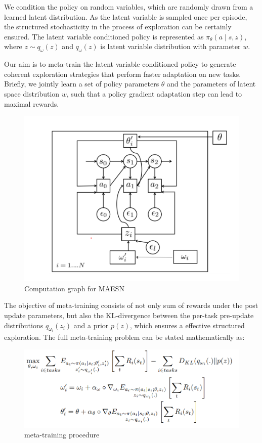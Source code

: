  We condition the policy on random variables, which are randomly drawn from a learned latent distribution. As the latent variable is sampled once per episode, the structured stochasticity in the process of exploration can be certainly ensured. The latent variable conditioned policy is represented as $\pi_{\theta}(a \mid s, z)$, where $z \sim q_{\omega}(z)$ and $q_{\omega}(z)$ is latent variable distribution with parameter $w$. 

Our aim is to meta-train the latent variable conditioned policy to generate coherent exploration strategies that perform faster adaptation on new tasks. Briefly, we jointly learn a set of policy parameters $\theta$ and the parameters of latent space distribution $w$, such that a policy gradient adaptation step can lead to maximal rewards.

\begin{figure}[H]
	\includegraphics[scale=0.6]{MAESN_02.PNG}
	\centering
	\caption{Computation graph for MAESN}
	\label{MAESN}
\end{figure}

The objective of meta-training consists of not only sum of rewards under the post update parameters, but also the KL-divergence between the per-task pre-update distributions $q_{\omega_{i}}\left(z_{i}\right)$ and a prior $p(z)$, which ensures a effective structured exploration.
The full meta-training problem can be stated mathematically as:

\begin{figure}[H]
	\includegraphics[scale=0.48]{MAESN_03.PNG}
	\centering
	\caption{meta-training procedure}
	\label{MAESN}
\end{figure}

